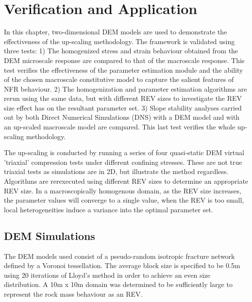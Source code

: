 \chapter{Verification and Application}
In this chapter, two-dimensional DEM models are used to demonstrate the effectiveness of the up-scaling methodology. The framework is validated using three tests: 1) The homogenized stress and strain behaviour obtained from the DEM microscale response are compared to that of the macroscale response. This test verifies the effectiveness of the parameter estimation module and the ability of the chosen macroscale constitutive model to capture the salient features of NFR behaviour. 2) The homogenization and parameter estimation algorithms are rerun using the same data, but with different REV sizes to investigate the REV size effect has on the resultant parameter set. 3) Slope stability analyses carried out by both Direct Numerical Simulations (DNS) with a DEM model and with an up-scaled macroscale model are compared. This last test verifies the whole up-scaling methodology.

The up-scaling is conducted by running a series of four quasi-static DEM virtual 'triaxial' compression tests under different confining stresses. These are not true triaxial tests as simulations are in 2D, but illustrate the method regardless. Algorithms are rerexecuted using different REV sizes to determine an appropriate REV size. In a macroscopically homogenous domain, as the REV size increases, the parameter values will converge to a single value, when the REV is too small, local heterogeneities induce a variance into the optimal parameter set.

\section{DEM Simulations}

The DEM models used consist of a pseudo-random isotropic fracture network defined by a Voronoi tessellation. The average block size is specified to be 0.5m using 20 iterations of Lloyd's method \citep{Lloyd_1982} in order to achieve an even size distribution. A 10m x 10m domain was determined to be sufficiently large to represent the rock mass behaviour as an REV. 

